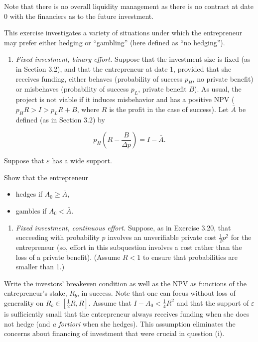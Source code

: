 \documentclass[11pt,a4paper]{article}
\providecommand{\tightlist}{\setlength{\itemsep}{0pt}\setlength{\parskip}{0pt}}
\begin{document}
Note that there is no overall liquidity management as there is no contract at date 0 with the
financiers as to the future investment.

This exercise investigates a variety of situations under which the entrepreneur may prefer either
hedging or ``gambling'' (here defined as ``no hedging'').

\begin{enumerate}
\def\labelenumi{(\roman{enumi})}
\tightlist
\item
  \emph{Fixed investment, binary effort.} Suppose that the investment size is fixed (as in Section
  3.2), and that the entrepreneur at date 1, provided that she receives funding, either behaves
  (probability of success \(p_H\), no private benefit) or misbehaves (probability of success
  \(p_L\), private benefit \(B\)). As usual, the project is not viable if it induces misbehavior and
  has a positive NPV (\(p_H R > I > p_L R + B\), where \(R\) is the profit in the case of success).
  Let \(\bar A\) be defined (as in Section 3.2) by
\end{enumerate}

\[p_H\left(R - \frac{B}{\Delta p}\right) = I - \bar A.\]

Suppose that \(\varepsilon\) has a wide support.

Show that the entrepreneur

\begin{itemize}
\tightlist
\item
  hedges if \(A_0 \geqslant \bar A\),
\item
  gambles if \(A_0 < \bar A\).
\end{itemize}

\begin{enumerate}
\def\labelenumi{(\roman{enumi})}
\setcounter{enumi}{1}
\tightlist
\item
  \emph{Fixed investment, continuous effort.} Suppose, as in Exercise 3.20, that succeeding with
  probability \(p\) involves an unverifiable private cost \(\frac{1}{2}p^2\) for the entrepreneur
  (so, effort in this subquestion involves a cost rather than the loss of a private benefit).
  (Assume \(R < 1\) to ensure that probabilities are smaller than 1.)
\end{enumerate}

Write the investors' breakeven condition as well as the NPV as functions of the entrepreneur's
stake, \(R_b\), in success. Note that one can focus without loss of generality on
\(R_b \in [\frac{1}{2}R, R]\). Assume that \(I - A_0 < \frac{1}{4}R^2\) and that the support of
\(\varepsilon\) is sufficiently small that the entrepreneur always receives funding when she does
not hedge (and \emph{a fortiori} when she hedges). This assumption eliminates the concerns about
financing of investment that were crucial in question (i).
\end{document}

